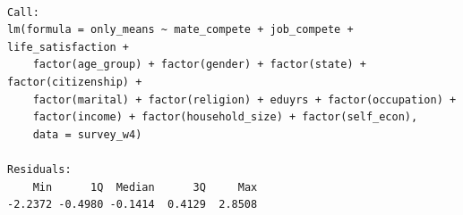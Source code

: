 \documentclass[
]{article}
\begin{document}
\begin{table}
\begin{minipage}[t]{\linewidth}
\end{minipage}%
\newline
\begin{minipage}[t]{\linewidth}

{\centering 

\begin{verbatim}

Call:
lm(formula = only_means ~ mate_compete + job_compete + life_satisfaction + 
    factor(age_group) + factor(gender) + factor(state) + factor(citizenship) + 
    factor(marital) + factor(religion) + eduyrs + factor(occupation) + 
    factor(income) + factor(household_size) + factor(self_econ), 
    data = survey_w4)

Residuals:
    Min      1Q  Median      3Q     Max 
-2.2372 -0.4980 -0.1414  0.4129  2.8508 


\end{verbatim}}
\end{minipage}
\end{table}
\end{document}

